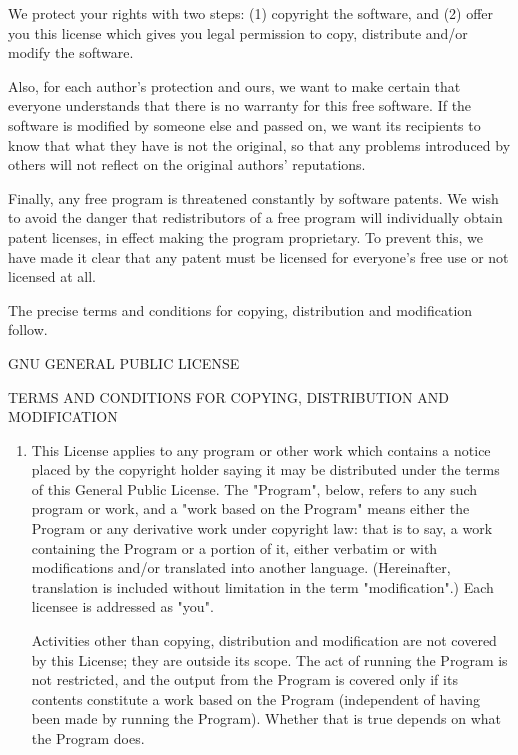 {  We protect your rights with two steps: (1) copyright the software, and
(2) offer you this license which gives you legal permission to copy,
distribute and/or modify the software.

  Also, for each author's protection and ours, we want to make certain
that everyone understands that there is no warranty for this free
software.  If the software is modified by someone else and passed on, we
want its recipients to know that what they have is not the original, so
that any problems introduced by others will not reflect on the original
authors' reputations.

  Finally, any free program is threatened constantly by software
patents.  We wish to avoid the danger that redistributors of a free
program will individually obtain patent licenses, in effect making the
program proprietary.  To prevent this, we have made it clear that any
patent must be licensed for everyone's free use or not licensed at all.

  The precise terms and conditions for copying, distribution and
modification follow.

\begin{center}
		    GNU GENERAL PUBLIC LICENSE

   TERMS AND CONDITIONS FOR COPYING, DISTRIBUTION AND MODIFICATION
\end{center}

\begin{enumerate}
\item This License applies to any program or other work which contains
a notice placed by the copyright holder saying it may be distributed
under the terms of this General Public License.  The "Program", below,
refers to any such program or work, and a "work based on the Program"
means either the Program or any derivative work under copyright law:
that is to say, a work containing the Program or a portion of it,
either verbatim or with modifications and/or translated into another
language.  (Hereinafter, translation is included without limitation in
the term "modification".)  Each licensee is addressed as "you".

Activities other than copying, distribution and modification are not
covered by this License; they are outside its scope.  The act of
running the Program is not restricted, and the output from the Program
is covered only if its contents constitute a work based on the
Program (independent of having been made by running the Program).
Whether that is true depends on what the Program does.


\end{enumerate}}
